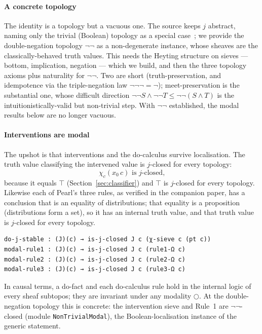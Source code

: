 \documentclass{lmcs}
\newcommand{\cl}{\bigcirc}
\newcommand{\nn}{\neg\neg}
\begin{document}
\paragraph{A concrete topology}
The identity is a topology but a vacuous one.
The source keeps $j$ abstract, naming only the trivial (Boolean) topology as a special case~\cite{mahadevan-2025b}; we provide the double-negation topology $\nn$ as a non-degenerate instance, whose sheaves are the classically-behaved truth values.
This needs the Heyting structure on sieves --- bottom, implication, negation --- which we build, and then the three topology axioms plus naturality for $\nn$.
Two are short (truth-preservation, and idempotence via the triple-negation law $\nn\neg = \neg$); meet-preservation is the substantial one, whose difficult direction $\nn S \wedge \nn T \le \nn(S \wedge T)$ is the intuitionistically-valid but non-trivial step.
With $\nn$ established, the modal results below are no longer vacuous.

\paragraph{Interventions are modal}
The upshot is that interventions and the do-calculus survive localisation.
The truth value classifying the intervened value is $j$-closed for every topology:
\[ \text{$\chi_c(x_0\,c)$ is $j$-closed,} \]
because it equals $\top$ (Section~\ref{sec:classifier}) and $\top$ is $j$-closed for every topology.
Likewise each of Pearl's three rules, as verified in the companion paper, has a conclusion that is an equality of distributions; that equality is a proposition (distributions form a set), so it has an internal truth value, and that truth value is $j$-closed for every topology.
\begin{lstlisting}
do-j-stable : (J)(c) → is-j-closed J c (χ-sieve c (pt c))
modal-rule1 : (J)(c) → is-j-closed J c (rule1-Ω c)
modal-rule2 : (J)(c) → is-j-closed J c (rule2-Ω c)
modal-rule3 : (J)(c) → is-j-closed J c (rule3-Ω c)
\end{lstlisting}
In causal terms, a do-fact and each do-calculus rule hold in the internal logic of every sheaf subtopos; they are invariant under any modality $\cl$.
At the double-negation topology this is concrete: the intervention sieve and Rule~1 are $\nn$-closed (module \texttt{NonTrivialModal}), the Boolean-localisation instance of the generic statement.
\end{document}
